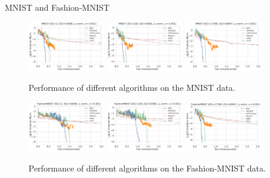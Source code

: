\begin{frame}{MNIST and Fashion-MNIST}
    \begin{figure}
        \centering
        \includegraphics[width=0.3\textwidth]{save/MNIST/run_times/ID1=2, ID2=54698, norm=l1, reg=0.001}
        \includegraphics[width=0.3\textwidth]{save/MNIST/run_times/ID1=239, ID2=43981, norm=l1, reg=0.001}
        \includegraphics[width=0.3\textwidth]{save/MNIST/run_times/ID1=17390, ID2=49947, norm=l1, reg=0.001}
        \caption{Performance of different algorithms on the MNIST data.}
        \label{fig:mnist}
    \end{figure}
    
    \begin{figure}
        \includegraphics[width=0.3\textwidth]{save/Fashion-MNIST/run_times/ID1=2, ID2=54698, norm=l1, reg=0.001}
        \includegraphics[width=0.3\textwidth]{save/Fashion-MNIST/run_times/ID1=239, ID2=43981, norm=l1, reg=0.001}
        \includegraphics[width=0.3\textwidth]{save/Fashion-MNIST/run_times/ID1=17390, ID2=49947, norm=l1, reg=0.001}
        \caption{Performance of different algorithms on the Fashion-MNIST data.}
        \label{fig:fashion-mnist}
    \end{figure}
\end{frame}

